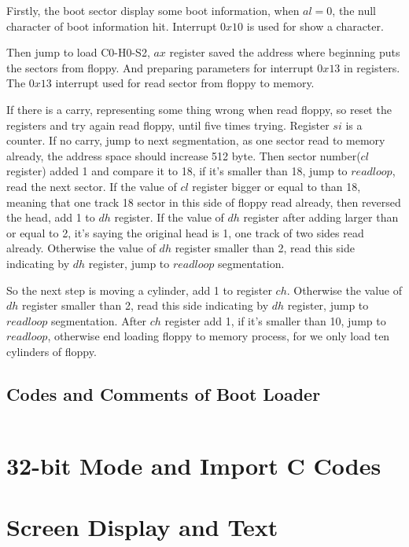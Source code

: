 \documentclass{swfcthesisp}
\begin{document}
Firstly, the boot sector display some boot information, when $al=0$, the null
character of boot information hit. Interrupt $0x10$ is used for show a character.
\par
Then jump to load C0-H0-S2, $ax$ register saved the
address where beginning puts the sectors from floppy. And preparing parameters for
interrupt $0x13$ in registers. The $0x13$ interrupt used for read sector from floppy to
memory.
\par If there is a carry, representing some thing wrong when read floppy, so reset the
registers and try again read floppy, until five times trying. Register $si$ is a counter. If
no carry, jump to next segmentation, as one sector read to memory already, the address
space should increase 512 byte. Then sector number($cl$ register) added 1 and compare it to 18, if it's
smaller than 18, jump to $readloop$, read the next sector. If the value of $cl$ register
bigger or equal to than 18, meaning that one track 18 sector in this side of floppy read already, then
reversed the head, add 1 to $dh$ register. If the value of $dh$ register after adding
larger than or equal to 2, it's saying the original head is 1, one track of two sides read
already. Otherwise the value of $dh$ register smaller than 2, read this side indicating by
$dh$ register, jump to $readloop$ segmentation.

\par So the next step is moving a cylinder, add 1 to register $ch$. Otherwise the
value of $dh$ register smaller than 2, read this side indicating by $dh$ register, jump to
$readloop$ segmentation. After $ch$ register add 1, if it's smaller than 10, jump to
$readloop$, otherwise end loading floppy to memory process, for we only load ten cylinders
of floppy.



\subsection{Codes and Comments of Boot Loader}
\label{sec:codes-comments}


\inputminted[linenos=true]{nasm}{../../src/06day/RongC/ipl10.nas}

\section{32-bit Mode and Import C Codes}


\section{Screen Display and Text}
\end{document}
